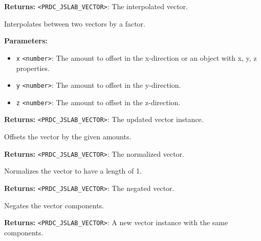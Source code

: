 \documentclass[12pt,a4paper]{article}
\begin{document}
\noindent \textbf{Returns:} \texttt{<PRDC\_JSLAB\_VECTOR>}: The interpolated vector.

\noindent Interpolates between two vectors by a factor.

\vspace{5mm}
\noindent {}


\noindent \textbf{Parameters:}
\begin{itemize}
  \item \texttt{x} \texttt{<number>}: The amount to offset in the x-direction or an object with x, y, z properties.
  \item \texttt{y} \texttt{<number>}: The amount to offset in the y-direction.
  \item \texttt{z} \texttt{<number>}: The amount to offset in the z-direction.
\end{itemize}

\noindent \textbf{Returns:} \texttt{<PRDC\_JSLAB\_VECTOR>}: The updated vector instance.

\noindent Offsets the vector by the given amounts.

\vspace{5mm}
\noindent {}


\noindent \textbf{Returns:} \texttt{<PRDC\_JSLAB\_VECTOR>}: The normalized vector.

\noindent Normalizes the vector to have a length of 1.

\vspace{5mm}
\noindent {}


\noindent \textbf{Returns:} \texttt{<PRDC\_JSLAB\_VECTOR>}: The negated vector.

\noindent Negates the vector components.

\vspace{5mm}
\noindent {}


\noindent \textbf{Returns:} \texttt{<PRDC\_JSLAB\_VECTOR>}: A new vector instance with the same components.
\end{document}
